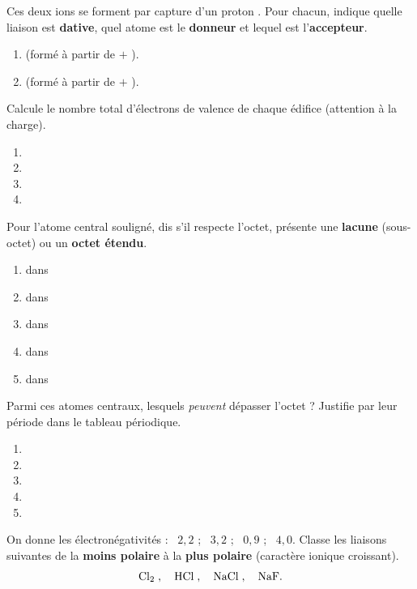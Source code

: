 \documentclass[11pt,a4paper]{article}
\begin{document}
\begin{exo}
Ces deux ions se forment par capture d'un proton . Pour chacun, indique quelle liaison est
\textbf{dative}, quel atome est le \textbf{donneur} et lequel est l'\textbf{accepteur}.
\begin{enumerate}[label=\alph*)]
  \item {} (formé à partir de  $+$ ).
  \item {} (formé à partir de  $+$ ).
\end{enumerate}
\end{exo}

\begin{exo}
Calcule le nombre total d'électrons de valence de chaque édifice (attention à la charge).
\begin{enumerate}[label=\alph*)]
  \item {}
  \item {}
  \item {}
  \item {}
\end{enumerate}
\end{exo}

\begin{exo}
Pour l'atome central souligné, dis s'il respecte l'octet, présente une \textbf{lacune}
(sous-octet) ou un \textbf{octet étendu}.
\begin{enumerate}[label=\alph*)]
  \item {} dans 
  \item {} dans 
  \item {} dans 
  \item {} dans 
  \item {} dans 
\end{enumerate}
\end{exo}

\begin{exo}
Parmi ces atomes centraux, lesquels \emph{peuvent} dépasser l'octet ? Justifie par leur période
dans le tableau périodique.
\begin{enumerate}[label=\alph*)]
  \item {}
  \item {}
  \item {}
  \item {}
  \item {}
\end{enumerate}
\end{exo}

\begin{exo}
On donne les électronégativités : ~$2{,}2$ ; ~$3{,}2$ ; ~$0{,}9$ ;
~$4{,}0$. Classe les liaisons suivantes de la \textbf{moins polaire} à la \textbf{plus
polaire} (caractère ionique croissant).
\[ \ce{Cl2}\;,\quad \ce{HCl}\;,\quad \ce{NaCl}\;,\quad \ce{NaF}. \]
\end{exo}
\end{document}
